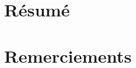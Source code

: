 \documentclass[11pt,a4paper,oneside]{report}
\begin{document}


\chapter*{Résumé}


\chapter*{Remerciements}


\tableofcontents











\printbibliography[heading=bibintoc]

\appendix

\end{document}
